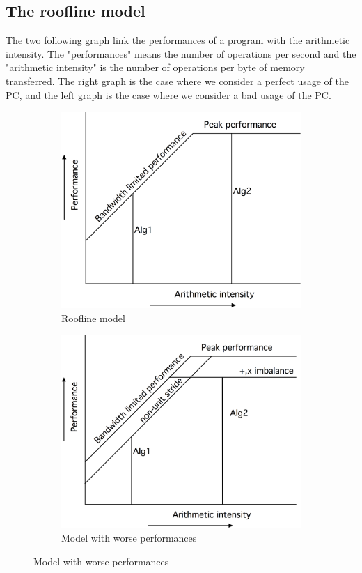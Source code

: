 \documentclass[12pt, openany]{report}
\theoremstyle{definition}
\begin{document}
\subsection{The roofline model}
The two following graph link the performances of a program with the arithmetic intensity. The "performances" means the number of operations per second and the "arithmetic intensity" is the number of operations per byte of memory transferred. The right graph is the case where we consider a perfect usage of the PC, and the left graph is the case where we consider a bad usage of the PC.  
\begin{figure}[H]
	\begin{subfigure}[b]{0.45\textwidth}
		\centering
		\includegraphics[scale=0.10]{img/roofline.jpeg}
		\caption{Roofline model}
		\label{fig:roofline}
	\end{subfigure}
	\begin{subfigure}[b]{0.45\textwidth}
		\centering
		\includegraphics[scale=0.10]{img/roofline2.jpeg}
		\caption{Model with worse performances}
		\label{fig:roofline2}
	\end{subfigure}
\end{figure}
\end{document}
